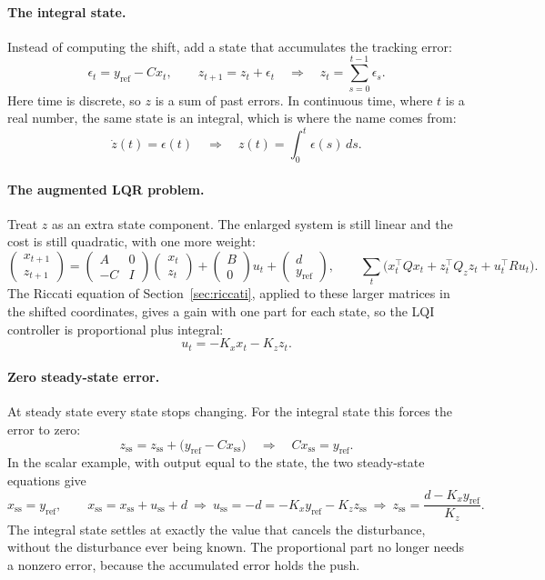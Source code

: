 \documentclass[11pt]{article}
\begin{document}
\paragraph{The integral state.} Instead of computing the shift, add a state that accumulates the
tracking error:
\[
  \epsilon_t = y_{\mathrm{ref}} - C x_t, \qquad z_{t+1} = z_t + \epsilon_t
  \quad\Longrightarrow\quad z_t = \sum_{s=0}^{t-1} \epsilon_s .
\]
Here time is discrete, so $z$ is a sum of past errors. In continuous time, where $t$ is a real
number, the same state is an integral, which is where the name comes from:
\[
  \dot z(t) = \epsilon(t) \quad\Longrightarrow\quad z(t) = \int_0^t \epsilon(s)\, ds .
\]

\paragraph{The augmented LQR problem.} Treat $z$ as an extra state component. The enlarged system is
still linear and the cost is still quadratic, with one more weight:
\[
  \begin{pmatrix} x_{t+1} \\ z_{t+1} \end{pmatrix}
  = \begin{pmatrix} A & 0 \\ -C & I \end{pmatrix}
    \begin{pmatrix} x_t \\ z_t \end{pmatrix}
  + \begin{pmatrix} B \\ 0 \end{pmatrix} u_t
  + \begin{pmatrix} d \\ y_{\mathrm{ref}} \end{pmatrix},
  \qquad
  \sum_t \Big( x_t^\top Q x_t + z_t^\top Q_z z_t + u_t^\top R u_t \Big).
\]
The Riccati equation of Section~\ref{sec:riccati}, applied to these larger matrices in the shifted
coordinates, gives a gain with one part for each state, so the LQI controller is proportional plus
integral:
\[
  u_t = -K_x x_t - K_z z_t .
\]

\paragraph{Zero steady-state error.} At steady state every state stops changing. For the integral
state this forces the error to zero:
\[
  z_{\mathrm{ss}} = z_{\mathrm{ss}} + \big(y_{\mathrm{ref}} - C x_{\mathrm{ss}}\big)
  \quad\Longrightarrow\quad C x_{\mathrm{ss}} = y_{\mathrm{ref}} .
\]
In the scalar example, with output equal to the state, the two steady-state equations give
\[
  x_{\mathrm{ss}} = y_{\mathrm{ref}}, \qquad
  x_{\mathrm{ss}} = x_{\mathrm{ss}} + u_{\mathrm{ss}} + d
  \ \Longrightarrow\ u_{\mathrm{ss}} = -d = -K_x y_{\mathrm{ref}} - K_z z_{\mathrm{ss}}
  \ \Longrightarrow\ z_{\mathrm{ss}} = \frac{d - K_x y_{\mathrm{ref}}}{K_z} .
\]
The integral state settles at exactly the value that cancels the disturbance, without the
disturbance ever being known. The proportional part no longer needs a nonzero error, because the
accumulated error holds the push.
\end{document}
